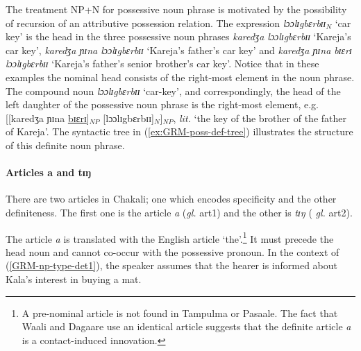 \begin{exe}
\begin{exe}
\begin{exe}
{\begin{exe}
\begin{exe}
The treatment  NP+N for possessive noun phrase is   motivated  by the
possibility of  recursion of  an attributive possession relation. The expression
{\it lɔɔlɪgbɛrbɪɪ}$_{N}$  `car 
key' is the head in the three possessive noun phrases   {\it karedʒa
lɔɔlɪgbɛrbɪɪ}
`Kareja's car key', {\it karedʒa ɲɪna lɔɔlɪgbɛrbɪɪ} `Kareja's father's car
 key' and {\it karedʒa ɲɪna bɪɛrɪ lɔɔlɪgbɛrbɪɪ}
`Kareja's father's senior brother's car  key'.  Notice that in these examples
  the nominal head consists of the right-most element in the noun phrase. The
compound noun  {\it  lɔɔlɪgbɛrbɪɪ}  `car-key', and correspondingly,
the head of the left daughter of the  possessive noun phrase is the right-most
element, e.g.   [[karedʒa ɲɪna \underline{bɪɛrɪ}]$_{NP}$
[lɔɔlɪgbɛrbɪɪ]$_{N}$]$_{NP}$,
{\it lit.} `the key of the brother of the father of
Kareja'. The syntactic tree in (\ref{ex:GRM-poss-def-tree}) illustrates the
structure of this definite noun phrase.


\ea\label{ex:GRM-poss-def-tree}
\z





\paragraph{Articles a and tɪŋ}
\label{sec:GRM-np-def-articles}

There are two articles in Chakali; one which encodes specificity and the other
definiteness. The first one is the 
article {\it a} ({\it gl.} {\sc art1}) and the other is  {\it tɪŋ}  ({\it
gl.} {\sc art2}).  

The  article {\it a} is translated with the English article
`the'.\footnote{A pre-nominal article is not found in Tampulma or Pasaale. The
fact that
Waali and Dagaare use an identical  article suggests that the definite article
{\it a}
is a contact-induced innovation.} It must precede the head noun and cannot
co-occur with the possessive pronoun.  In the context of
(\ref{GRM-np-type-det1}), the speaker assumes that the hearer is informed about
Kala's interest in buying a mat. 



\end{exe}
\end{exe}}
\end{exe}
\end{exe}
\end{exe}
